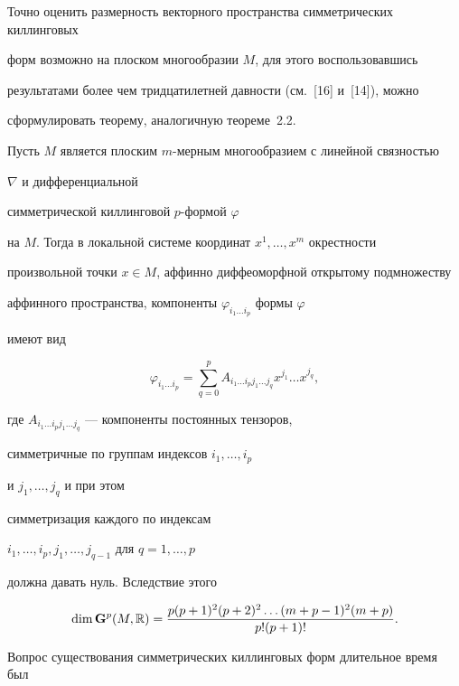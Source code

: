 Точно оценить размерность векторного пространства симметрических киллинговых


форм возможно на плоском многообразии $M$, для этого воспользовавшись


результатами более чем тридцатилетней давности (см.~[16] и~[14]), можно


сформулировать теорему, аналогичную тео\-ре\-ме~2.2.





\begin{thms}


Пусть $M$ является плоским $m$-мерным многообразием с линейной связностью


$\nabla$ и  дифференциальной


симметрической киллинговой $p$-формой $\varphi$


на $M$. Тогда в локальной системе координат $x^1,\dotsc,x^m$ окрестности


произвольной точки $x\in M$, аффинно диффеоморфной открытому подмножеству


аффинного пространства, компоненты $\varphi_{i_1\dotsc i_p}$ формы $\varphi$


имеют вид


$$


\varphi_{i_1\dotsc i_p}=\sum^p_{q=0}A_{i_1\dotsc i_p j_1\dotsc j_q}


x^{j_1}\dotsc x^{j_q},


$$


где $A_{i_1\dotsc i_p j_1\dotsc j_q}$ --- компоненты постоянных тензоров,


симметричные по группам индексов $i_1,\dotsc,i_p$


и $j_1,\dotsc,j_q$ и при этом


симметризация каждого по индексам


$i_1,\dotsc,i_p,j_1,\dotsc,j_{q-1}$ для $q=1,\dotsc,p$


должна давать нуль. Вследствие этого


$$


\dim {\bold G}^p(M,\Bbb R)=


\frac{p(p+1)^2(p+2)^2\dotsc(m+p-1)^2(m+p)}{p!(p+1)!}.


$$


\end{thms}





Вопрос существования симметрических киллинговых форм длительное время был


